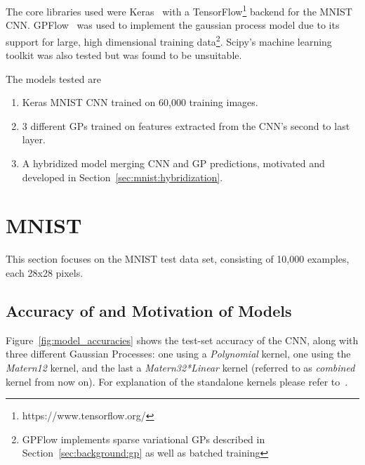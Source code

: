 \documentclass{article}
\begin{document}
The core libraries used were Keras~\cite{chollet2015keras} with a TensorFlow\footnote{https://www.tensorflow.org/} backend for the MNIST CNN. GPFlow~\cite{GPflow2017} was used to implement the gaussian process model due to its support for large, high dimensional training data\footnote{GPFlow implements sparse variational GPs described in Section~\ref{sec:background:gp} as well as batched training}. Scipy's machine learning toolkit was also tested but was found to be unsuitable.

The models tested are
\begin{enumerate}
\item Keras MNIST CNN trained on 60,000 training images.
\item 3 different GPs trained on features extracted from the CNN's second to last layer.
\item A hybridized model merging CNN and GP predictions, motivated and developed in Section~\ref{sec:mnist:hybridization}.
\end{enumerate} 








\section{MNIST}
\label{sec:mnist}
This section focuses on the MNIST test data set, consisting of 10,000 examples, each 28x28 pixels.

\subsection{Accuracy of and Motivation of Models}
\label{sec:mnist:acc}

Figure~\ref{fig:model_accuracies} shows the test-set accuracy of the CNN, along with three different Gaussian Processes: one using a \textit{Polynomial} kernel, one using the \textit{Matern12} kernel, and the last a \textit{Matern32*Linear} kernel (referred to as \textit{combined} kernel from now on). For explanation of the standalone kernels please refer to~\citet{rasmussen2006gaussian}.
\end{document}

